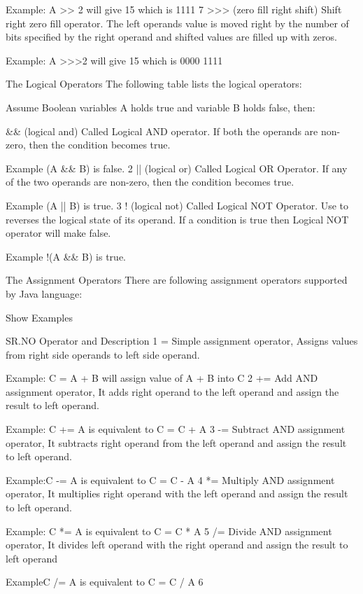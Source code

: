 Example: A >> 2 will give 15 which is 1111 7 >>> (zero fill right shift) Shift right zero fill operator. The left operands value is moved right by the number of bits specified by the right operand and shifted values are filled up with zeros.

Example: A >>>2 will give 15 which is 0000 1111

The Logical Operators
The following table lists the logical operators:

Assume Boolean variables A holds true and variable B holds false, then:

&& (logical and) Called Logical AND operator. If both the operands are non-zero, then the condition becomes true.

Example (A && B) is false. 2 || (logical or) Called Logical OR Operator. If any of the two operands are non-zero, then the condition becomes true.

Example (A || B) is true. 3 ! (logical not) Called Logical NOT Operator. Use to reverses the logical state of its operand. If a condition is true then Logical NOT operator will make false.

Example !(A && B) is true.

The Assignment Operators
There are following assignment operators supported by Java language:

Show Examples

SR.NO Operator and Description 1 = Simple assignment operator, Assigns values from right side operands to left side operand.

Example: C = A + B will assign value of A + B into C 2 += Add AND assignment operator, It adds right operand to the left operand and assign the result to left operand.

Example: C += A is equivalent to C = C + A 3 -= Subtract AND assignment operator, It subtracts right operand from the left operand and assign the result to left operand.

Example:C -= A is equivalent to C = C - A 4 *= Multiply AND assignment operator, It multiplies right operand with the left operand and assign the result to left operand.

Example: C *= A is equivalent to C = C * A 5 /= Divide AND assignment operator, It divides left operand with the right operand and assign the result to left operand

ExampleC /= A is equivalent to C = C / A 6 %

